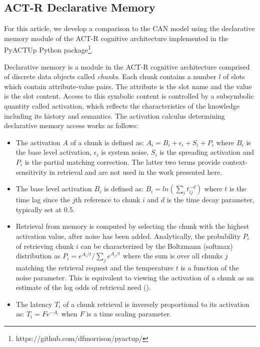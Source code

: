 \documentclass[10pt,letterpaper]{article}
\begin{document}
\subsection{ACT-R Declarative Memory}
For this article, we develop a comparison to the CAN model using the declarative memory module of the ACT-R cognitive architecture implemented in the PyACTUp Python package\footnote{https://github.com/dfmorrison/pyactup/}.  

Declarative memory is a module in the ACT-R cognitive architecture comprised of discrete data objects called \textit{chunks}.  Each chunk contains a number $l$ of slots which contain attribute-value pairs. The attribute is the slot name and the value is the slot content. Access to this symbolic content is controlled by a subsymbolic quantity called activation, which reflects the characteristics of the knowledge including its history and semantics. The activation calculus determining declarative memory access works as follows:

\begin{itemize}
    \item The activation $A$ of a chunk is defined as: $A_i = B_i + \epsilon_i + S_i + P_i$ where $B_i$ is the base level activation, $\epsilon_i$ is system noise, $S_i$ is the spreading activation and $P_i$ is the partial matching correction. The latter two terms provide context-sensitivity in retrieval and are not used in the work presented here.
    \item The base level activation $B_i$ is defined as: $B_i=ln(\sum_i t_{ij}^{-d})$ where $t$ is the time lag since the $j$th reference to chunk $i$ and $d$ is the time decay parameter, typically set at 0.5. 
    \item Retrieval from memory is computed by selecting the chunk with the highest activation value, after noise has been added. Analytically, the probability $P_i$ of retrieving chunk $i$ can be characterized by the Boltzmann (softmax) distribution as $P_i = e^{A_i/t} / \sum_j e^{A_j/t}$ where the sum is over all chunks $j$ matching the retrieval request and the temperature $t$ is a function of the noise parameter. This is equivalent to viewing the activation of a chunk as an estimate of the log odds of retrieval need (\cite{anderson1990}).
    \item The latency $T_i$ of a chunk retrieval is inversely proportional to its activation as: $T_i = F e^{-A_i}$ when $F$ is a time scaling parameter.
\end{itemize}
\end{document}
